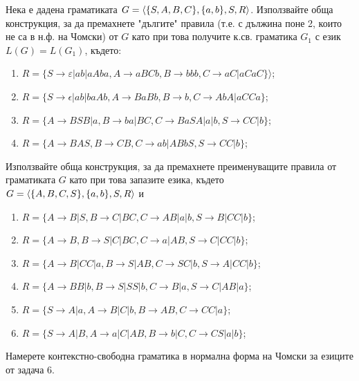 \begin{problem}
  Нека е дадена граматиката  $G = \langle{\{S,A,B,C\}, \{a,b\}, S, R}\rangle$.
  Използвайте обща конструкция, за да премахнете "дългите" правила 
  (т.е. с дължина поне 2, които не са в н.ф. на Чомски) от $ G$ като при това получите к.св. граматика $G_1$ 
  с език $L(G)=L(G_1)$, където:
  \begin{enumerate}
  \item
    $R = \{S \rightarrow \varepsilon|ab|aAba, A\rightarrow aBCb, B\rightarrow bbb, C\rightarrow aC\vert aCaC\}\rangle$;
  \item
    $R = \{S \rightarrow \epsilon|ab|baAb, A\rightarrow BaBb,B\rightarrow b,C\rightarrow AbA\vert aCCa\}$;
  \item
    $R = \{A\rightarrow BSB|a,B\rightarrow ba|BC,C\rightarrow BaSA|a|b,S\rightarrow CC|b\}$;
  \item
    $R = \{A\rightarrow BAS,B\rightarrow CB,C\rightarrow ab|ABbS,S\rightarrow CC|b\}$;
  \end{enumerate}
\end{problem}


\begin{problem}
  Използвайте обща конструкция, за да премахнете преименуващите правила от граматиката $G$ като при това запазите езика,
  където $G = \langle{\{A,B,C,S\},\{a,b\}, S, R}\rangle$ и
  \begin{enumerate}
  \item
    $R = \{A\rightarrow B|S,B\rightarrow C|BC,C\rightarrow AB|a|b,S\rightarrow B|CC|b\}$;
  \item
    $R = \{A\rightarrow B,B\rightarrow S|C|BC,C\rightarrow a|AB,S\rightarrow C|CC|b\}$;
  \item
    $R = \{A\rightarrow B|CC|a,B\rightarrow S|AB,C\rightarrow SC|b,S\rightarrow A|CC|b\}$;
  \item
    $R = \{A\rightarrow BB|b,B\rightarrow S|SS|b,C\rightarrow B|a,S\rightarrow C|AB|a\}$;
  \item
    $R = \{S\rightarrow A|a,A\rightarrow B|C|b, B\rightarrow AB, C\rightarrow CC|a\}$;
  \item
    $R = \{S\rightarrow A|B, A\rightarrow a|C|AB, B\rightarrow b|C, C\rightarrow CS|a|b\}$;
  \end{enumerate}
\end{problem}

\begin{problem}
  Намерете контекстно-свободна граматика в нормална форма на Чомски за езиците от задача 6.
  
\end{problem}



